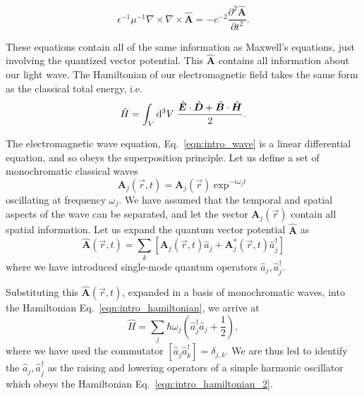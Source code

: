 \begin{equation}\label{eqn:intro_wave}
\epsilon^{-1} \mu^{-1} \nabla \times \nabla \times \hat{\bm{A}} = - c^{-2} \frac{\partial^2 \hat{\bm{A}}}{\partial t^2}.
\end{equation}

\noindent These equations contain all of the same information as Maxwell's equations, just involving the quantized vector potential. This $\hat{\bm{A}}$ contains all information about our light wave. The Hamiltonian of our electromagnetic field takes the same form as the classical total energy, i.e.
\begin{equation}\label{eqn:intro_hamiltonian}
\hat{H} = \int_V \mathop{}\!\mathrm{d^3} V \; \frac{\hat{\bm{E}} \cdot \hat{\bm{D}} + \hat{\bm{B}} \cdot \hat{\bm{H}}}{2}.
\end{equation}


\noindent The electromagnetic wave equation, Eq.~\ref{eqn:intro_wave} is a linear differential equation, and so obeys the superposition principle. Let us define a set of monochromatic classical waves
\begin{equation}
\bm{A}_j\left(\overrightarrow{r}, t\right) = \bm{A}_j\left(\overrightarrow{r}\right) \exp^{-i \omega_j t}
\end{equation}
oscillating at frequency $\omega_j$. We have assumed that the temporal and spatial aspects of the wave can be separated, and let the vector $\bm{A}_j\left(\overrightarrow{r}\right)$ contain all spatial information. %
Let us expand the quantum vector potential $\hat{\bm{A}}$ as
\begin{equation}
\hat{\bm{A}}\left(\overrightarrow{r}, t\right) = \sum_k \left[ \bm{A}_j\left(\overrightarrow{r}, t\right) \hat{a}_j + \bm{A}_j^* \left(\overrightarrow{r}, t\right) \hat{a}_j^\dagger\right]
\end{equation}
where we have introduced single-mode quantum operators $\hat{a}_j, \hat{a}_j^\dagger$.

Substituting this $\hat{\bm{A}}\left(\overrightarrow{r}, t\right)$, expanded in a basis of monochromatic waves, into the Hamiltonian Eq.~\ref{eqn:intro_hamiltonian}, we arrive at
\begin{equation}\label{eqn:intro_hamiltonian_2}
\hat{H} = \sum_j \hbar \omega_j \left( \hat{a}_j^\dagger \hat{a}_j + \frac{1}{2}\right),
\end{equation}
where we have used the commutator $\left[ \hat{a}_j \hat{a}_k^\dagger \right] = \delta_{j, k}$. We are thus led to identify the $\hat{a}_j, \hat{a}_j^\dagger$ as the raising and lowering operators of a simple harmonic oscillator which obeys the Hamiltonian Eq.~\ref{eqn:intro_hamiltonian_2}. 

